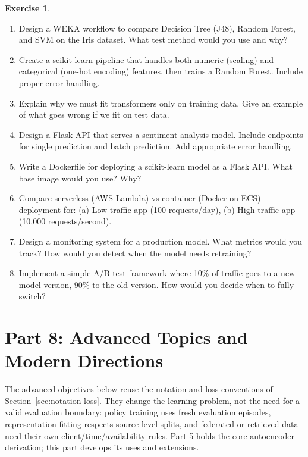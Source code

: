 \documentclass[11pt,twoside]{article}
\numberwithin{equation}{section}
\theoremstyle{plain}
\theoremstyle{definition}
\newtheorem{exercise}[theorem]{Exercise}
\theoremstyle{remark}
\begin{document}
\begin{exercise}
\begin{enumerate}
\item Design a WEKA workflow to compare Decision Tree (J48), Random Forest, and SVM on the Iris dataset. What test method would you use and why?

\item Create a scikit-learn pipeline that handles both numeric (scaling) and categorical (one-hot encoding) features, then trains a Random Forest. Include proper error handling.

\item Explain why we must fit transformers only on training data. Give an example of what goes wrong if we fit on test data.

\item Design a Flask API that serves a sentiment analysis model. Include endpoints for single prediction and batch prediction. Add appropriate error handling.

\item Write a Dockerfile for deploying a scikit-learn model as a Flask API. What base image would you use? Why?

\item Compare serverless (AWS Lambda) vs container (Docker on ECS) deployment for: (a) Low-traffic app (100 requests/day), (b) High-traffic app (10,000 requests/second).

\item Design a monitoring system for a production model. What metrics would you track? How would you detect when the model needs retraining?

\item Implement a simple A/B test framework where 10\% of traffic goes to a new model version, 90\% to the old version. How would you decide when to fully switch?
\end{enumerate}
\end{exercise}

\section*{Part 8: Advanced Topics and Modern Directions}
The advanced objectives below reuse the notation and loss conventions of
Section~\ref{sec:notation-loss}. They change the learning problem, not the
need for a valid evaluation boundary: policy training uses fresh evaluation
episodes, representation fitting respects source-level splits, and federated
or retrieved data need their own client/time/availability rules. Part 5 holds
the core autoencoder derivation; this part develops its uses and extensions.
\end{document}

